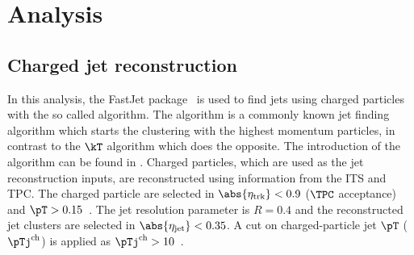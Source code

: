 
\section{Analysis}%
\label{sec:Analysis}

\subsection{Charged jet reconstruction}%
\label{sec:JetRec}

In this analysis, the FastJet package~\cite{Cacciari:2011ma} is used to find jets using charged particles with the so called \akT algorithm.
The \akT algorithm is a commonly known jet finding algorithm which starts the clustering with the highest momentum particles, in contrast to the $\kT$ algorithm which does the opposite.
The introduction of the algorithm can be found in \cite{Cacciari:2008gp}.
Charged particles, which are used as the jet reconstruction inputs, are reconstructed using information from the ITS and TPC.
The charged particle are selected in $\abs{\eta_{\rm trk}} < 0.9$ ($\TPC$ acceptance) and $\pT> 0.15$~\GeVc.
The jet resolution parameter is $R = 0.4$ and the reconstructed jet clusters are selected in $\abs{\eta_{\rm jet}} < 0.35$.
A cut on charged-particle jet $\pT$ ($\pTj^{\rm ch}$) is applied as $\pTj^{\rm ch} > 10$~\GeVc.


